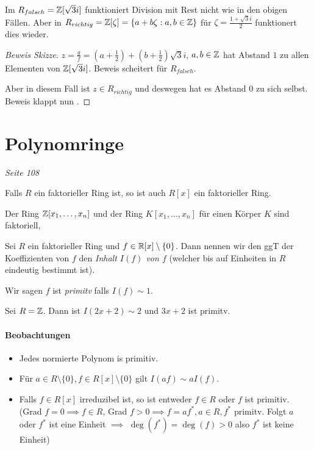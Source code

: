 \begin{theorem}
	Im $R_{falsch} = \mathbb{Z}[\sqrt{3}i]$ funktioniert Division mit Rest nicht wie in den obigen Fällen.
	Aber in $R_{richtig} = \mathbb{Z}[\zeta] = \{a+b \zeta : a,b \in \mathbb{Z}\} $ für $\zeta = \frac{1+\sqrt{3} i}{2}$ funktionert dies wieder.
\end{theorem}

\begin{proof}[Beweis Skizze]

$z = \frac{g}{f} = (a+\frac{1}{2}) + (b+\frac{1}{2}) \sqrt{3} i$, $a,b \in \mathbb{Z}$ hat Abstand $1$ zu allen Elementen von $\mathbb{Z}[\sqrt{3}i]$.
Beweis scheitert für $R_{falsch}$.

Aber in diesem Fall ist $z \in R_{richtig}$ und deswegen hat es Abstand $0$ zu sich selbst. Beweis klappt nun .

\end{proof}



\section{Polynomringe}
\emph{Seite 108}

\begin{theorem}[Gauss]
	Falls $R$ ein faktorieller Ring ist, so ist auch $R[x]$ ein faktorieller Ring.
\end{theorem}

\begin{corollary}
	Der Ring $\mathbb{Z}[x_1,\ldots,x_{n}]$ und der Ring $K[x_1,\ldots,x_{n}]$ für einen Körper $K$ sind faktoriell,
\end{corollary}

\begin{definition}
	Sei $R$ ein faktorieller Ring und $f \in \mathbb{R}[x] \setminus \{0\}$.
	Dann nennen wir den ggT der Koeffizienten von $f$ den \emph{Inhalt $I(f)$ von $f$ }
	(welcher bis auf Einheiten in $R$ eindeutig bestimmt ist).

	Wir sagen $f$ ist \emph{primitv} falls $I(f) \sim 1$.
\end{definition}

\begin{eg}
	Sei $R = \mathbb{Z}$. Dann ist $I(2x+2) \sim 2$ und  $3x+2$ ist primitv.
\end{eg}

\paragraph{Beobachtungen}
\begin{itemize}
	\item Jedes normierte Polynom is primitiv.
	\item Für $a \in R \setminus \{0\}, f \in R[x] \setminus \{0\} $ gilt $I(af) \sim a I(f)$.
	\item Falls  $f \in R[x]$ irreduzibel ist, so ist entweder
		$f \in R$ oder $f$ ist primitiv.
		(Grad $f = 0 \implies f \in R$, Grad $f > 0 \implies f = a f^{*}, a \in R, f^{*}$ primitv.
		Folgt $a$ oder $f^{*}$ ist eine Einheit $\implies$ $\deg(f^{*}) = \deg(f) > 0$ also $f^{*}$ ist keine Einheit)
\end{itemize}

